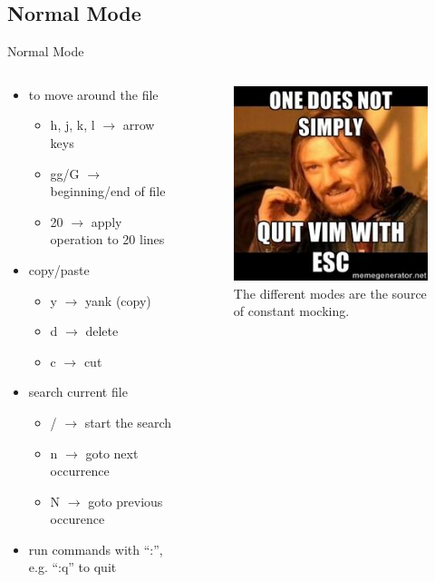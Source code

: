 \documentclass[xcolor=x11names,compress,t]{beamer}
\renewcommand{\(}{\begin{columns}[T]}
\renewcommand{\)}{\end{columns}}
\newcommand{\<}[1]{\begin{column}{#1}}
\renewcommand{\>}{\end{column}}
\newenvironment{slide}[1]{\subsection{#1} \begin{frame}{#1}}{\end{frame}}
\begin{document}
\begin{slide}{Normal Mode}
    \begin{columns}
        \begin{column}{0.65\textwidth}
            \begin{itemize}
                \item to move around the file
                    \begin{itemize}
                        \item h, j, k, l $\longrightarrow$ arrow keys
                        \item gg/G $\longrightarrow$ beginning/end of file
                        \item 20 $\longrightarrow$ apply operation to 20 lines
                    \end{itemize}
                \item copy/paste
                    \begin{itemize}
                        \item y $\longrightarrow$ yank (copy)
                        \item d $\longrightarrow$ delete
                        \item c $\longrightarrow$ cut
                    \end{itemize}
                \item search current file
                    \begin{itemize}
                        \item / $\longrightarrow$ start the search
                        \item n $\longrightarrow$ goto next occurrence
                        \item N $\longrightarrow$ goto previous occurence
                    \end{itemize}
                \item run commands with ``:'', e.g. ``:q'' to quit
            \end{itemize}
        \end{column}
        \begin{column}{0.35\textwidth}
            \begin{figure}
                \includegraphics[scale=0.42]{vim-meme}
                \caption{The different modes are the source of constant mocking.}
            \end{figure}
        \end{column}
    \end{columns}
\end{slide}
\end{document}
